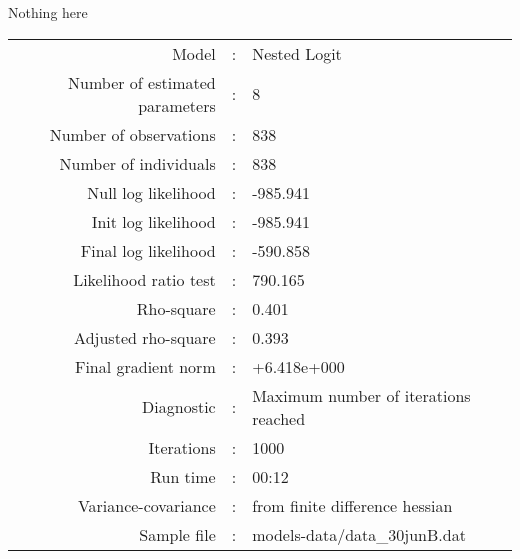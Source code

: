 Nothing here\\


\begin{flushleft}
\begin{tabular}{rcl}
\hline
Model &:& Nested Logit\\
Number of estimated parameters&:&8\\
Number of  observations &:& 838\\
Number of individuals&:&838\\
Null log likelihood&:&-985.941\\
Init log likelihood&:&-985.941\\
Final log likelihood&:&-590.858\\
Likelihood ratio test &:&790.165\\
Rho-square&:&0.401\\
Adjusted rho-square&:&0.393\\
Final gradient norm&:&+6.418e+000\\
Diagnostic&:&Maximum number of iterations reached\\
Iterations&:&1000\\
Run time&:&00:12\\
Variance-covariance&:&from finite difference hessian\\
Sample file&:&models-data/data_30junB.dat\\
\end{tabular}
\end{flushleft}
